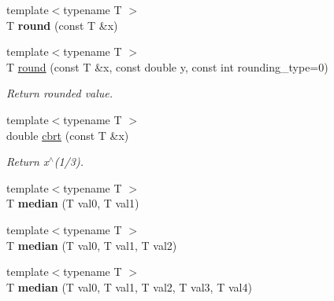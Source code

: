 \begin{DoxyCompactItemize}
\mbox{\label{namespacecimg__library__suffixed_1_1cimg_a7bed9b422eb303150d7abb503e7201fc}} 
{\footnotesize template$<$typename T $>$ }\\T {\bfseries round} (const T \&x)
\item 
{\footnotesize template$<$typename T $>$ }\\T \hyperlink{namespacecimg__library__suffixed_1_1cimg_a66a32585b286a3c7f76d745107ae5300}{round} (const T \&x, const double y, const int rounding\+\_\+type=0)
\begin{DoxyCompactList}\small\item\em Return rounded value. \end{DoxyCompactList}\item 
\mbox{\label{namespacecimg__library__suffixed_1_1cimg_ad72601dd5481dc3abd338d9ed1604622}} 
{\footnotesize template$<$typename T $>$ }\\double \hyperlink{namespacecimg__library__suffixed_1_1cimg_ad72601dd5481dc3abd338d9ed1604622}{cbrt} (const T \&x)
\begin{DoxyCompactList}\small\item\em Return x$^\wedge$(1/3). \end{DoxyCompactList}\item 
\mbox{\label{namespacecimg__library__suffixed_1_1cimg_acf4703b2dd4307ecbdf61e7fc5d93800}} 
{\footnotesize template$<$typename T $>$ }\\T {\bfseries median} (T val0, T val1)
\item 
\mbox{\label{namespacecimg__library__suffixed_1_1cimg_ac941c3a7e6b58e225a63d0f8ee7a28b2}} 
{\footnotesize template$<$typename T $>$ }\\T {\bfseries median} (T val0, T val1, T val2)
\item 
\mbox{\label{namespacecimg__library__suffixed_1_1cimg_abe9263120cac5615f302f88d2674aab6}} 
{\footnotesize template$<$typename T $>$ }\\T {\bfseries median} (T val0, T val1, T val2, T val3, T val4)
\item 
\mbox{\label{namespacecimg__library__suffixed_1_1cimg_ac800cb8692cd896502ea26f201e5dc2f}} 

\end{DoxyCompactItemize}
